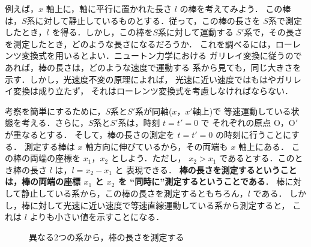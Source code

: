     例えば，$x$ 軸上に，軸に平行に置かれた長さ $l$ の棒を考えてみよう．
    この棒は，$S$系に対して静止しているものとする．従って，この棒の長さを
    $S$系で測定したとき，$l$ を得る．しかし，この棒を$S$系に対して運動する
    $S'$系で，その長さを測定したとき，どのような長さになるだろうか．
    これを調べるには，ローレンツ変換式を用いるとよい．ニュートン力学における
    ガリレイ変換に従うのであれば，棒の長さは，どのような速度で運動する
    系から見ても，同じ大きさを示す．しかし，光速度不変の原理によれば，
    光速に近い速度ではもはやガリレイ変換は成り立たず，
    それはローレンツ変換式を考慮しなければならない．

    考察を簡単にするために，$S$系と$S'$系が同軸($x$，$x'$軸上)で
    等速運動している状態を考える．さらに，$S$系と$S'$系は，時刻 $t=t'=0$ で
    それぞれの原点 O，O$'$ が重なるとする．
    そして，棒の長さの測定を $t=t'=0$ の時刻に行うことにする．
    測定する棒は $x$ 軸方向に伸びているから，その両端も $x$ 軸上にある．
    この棒の両端の座標を $x_{1}$，$x_{2}$ としよう．ただし，
    $x_{2}>x_{1}$ であるとする．このとき棒の長さ $l$ は，$l=x_{2}-x_{1}$ と
    表現できる．
    \textbf{棒の長さを測定するということは，棒の両端の座標 $x_{1}$ と $x_{2}$ を
    “同時に”測定するということである}．
    棒に対して静止している系から，この棒の長さを測定するともちろん，$l$ である．
    しかし，棒に対して光速に近い速度で等速直線運動している系から測定すると，
    これは $l$ よりも小さい値を示すことになる．
                \begin{figure}[hbt]
                    \begin{center}
                        \caption{異なる2つの系から，棒の長さを測定する}
                        \label{fig:Length}
                    \end{center}
                \end{figure}


